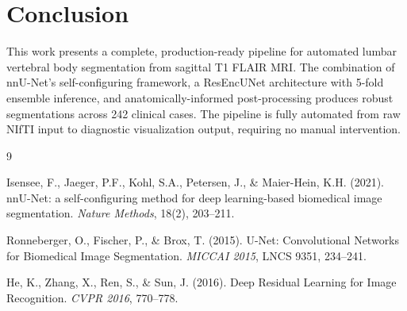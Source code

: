 \documentclass[12pt, a4paper]{article}
\begin{document}
\section{Conclusion}

This work presents a complete, production-ready pipeline for automated lumbar vertebral body segmentation from sagittal T1 FLAIR MRI. The combination of nnU-Net's self-configuring framework, a ResEncUNet architecture with 5-fold ensemble inference, and anatomically-informed post-processing produces robust segmentations across 242 clinical cases. The pipeline is fully automated from raw NIfTI input to diagnostic visualization output, requiring no manual intervention.

\begin{thebibliography}{9}

Isensee, F., Jaeger, P.F., Kohl, S.A., Petersen, J., \& Maier-Hein, K.H. (2021).
nnU-Net: a self-configuring method for deep learning-based biomedical image segmentation.
\textit{Nature Methods}, 18(2), 203--211.

Ronneberger, O., Fischer, P., \& Brox, T. (2015).
U-Net: Convolutional Networks for Biomedical Image Segmentation.
\textit{MICCAI 2015}, LNCS 9351, 234--241.

He, K., Zhang, X., Ren, S., \& Sun, J. (2016).
Deep Residual Learning for Image Recognition.
\textit{CVPR 2016}, 770--778.

\end{thebibliography}
\end{document}
